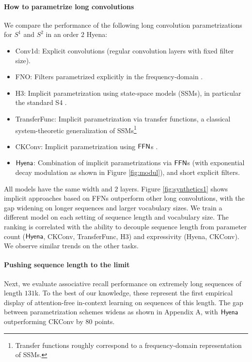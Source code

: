 \paragraph{How to parametrize long convolutions}
%
We compare the performance of the following long convolution parametrizations for $S^1$ and $S^2$ in an order $2$ Hyena:
%
\begin{itemize}[leftmargin=0.1in]
    \item Conv1d: Explicit convolutions (regular convolution layers with fixed filter size).
    \item FNO: Filters parametrized explicitly in the frequency-domain \citep{li2020fourier}.
    \item H3: Implicit parametrization using state-space models (SSMs), in particular the standard S4 \citep{gu2021efficiently}. 
    \item TransferFunc: Implicit parametrization via transfer functions, a classical system-theoretic generalization of SSMs\footnote{Transfer functions roughly correspond to a frequency-domain representation of SSMs.} 
    \item CKConv: Implicit parametrization using {$\sf FFN$s} \citep{romero2021ckconv}. 
    \item ${\sf Hyena}$: Combination of implicit parametrizations via {$\sf FFN$s} (with exponential decay modulation as shown in Figure \ref{fig:modul}), and short explicit filters.
\end{itemize}
%
All models have the same width and $2$ layers. Figure \ref{fig:synthetics1} shows implicit approaches based on {\sf FFNs} outperform other long convolutions, with the gap widening on longer sequences and larger vocabulary sizes. We train a different model on each setting of sequence length and vocabulary size. The ranking is correlated with the ability to decouple sequence length from parameter count (${\sf Hyena}$, CKConv, TransferFunc, H3) and expressivity (Hyena, CKConv). We observe similar trends on the other tasks.
%
\paragraph{Pushing sequence length to the limit}
%
Next, we evaluate associative recall performance on extremely long sequences of length $131$k. To the best of our knowledge, these represent the first empirical display of attention-free in-context learning on sequences of this length. The gap between parametrization schemes widens as shown in Appendix A, with ${\sf Hyena}$ outperforming CKConv by $80$ points.
%

